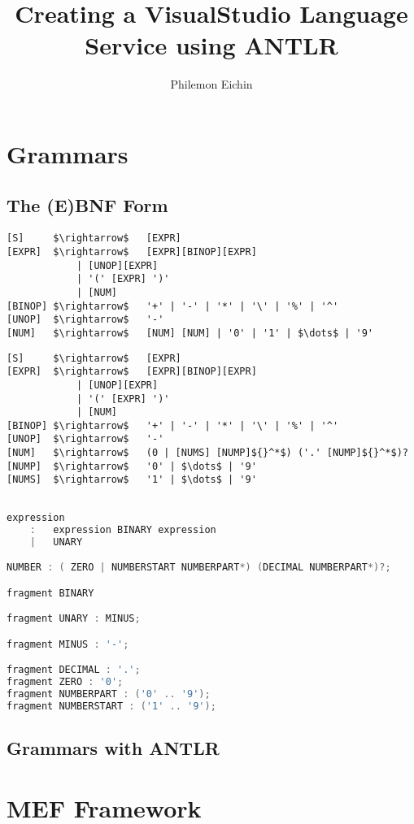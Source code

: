\documentclass{scrbook}
\author{Philemon Eichin}
\title{Creating a VisualStudio Language Service using ANTLR}
\begin{document}
\maketitle

\tableofcontents
\part{Grammars}
\chapter{The (E)BNF Form}
\lstset{language=BNF,tabsize=4, numbers=left, stepnumber=5, frame=single}
\begin{lstlisting}[caption={Basic mathematical grammar (BNF)}]
[S]		$\rightarrow$	[EXPR]
[EXPR]	$\rightarrow$	[EXPR][BINOP][EXPR]
			| [UNOP][EXPR] 
			| '(' [EXPR] ')' 
			| [NUM]
[BINOP]	$\rightarrow$	'+' | '-' | '*' | '\' | '%' | '^'
[UNOP]	$\rightarrow$ 	'-'
[NUM] 	$\rightarrow$ 	[NUM] [NUM] | '0' | '1' | $\dots$ | '9'
\end{lstlisting}

\begin{lstlisting}[caption={Better basic mathematical grammar (EBNF)}]
[S]		$\rightarrow$	[EXPR]
[EXPR]	$\rightarrow$	[EXPR][BINOP][EXPR]
			| [UNOP][EXPR] 
			| '(' [EXPR] ')' 
			| [NUM]
[BINOP]	$\rightarrow$	'+' | '-' | '*' | '\' | '%' | '^'
[UNOP]	$\rightarrow$ 	'-'
[NUM] 	$\rightarrow$ 	(0 | [NUMS] [NUMP]${}^*$) ('.' [NUMP]${}^*$)?
[NUMP]	$\rightarrow$ 	'0' | $\dots$ | '9'
[NUMS]	$\rightarrow$ 	'1' | $\dots$ | '9'
\end{lstlisting}

\begin{lstlisting}[caption={Basic mathematical grammar (ANTLR grammar)}, language=java]

expression
	:	expression BINARY expression
	|	UNARY

NUMBER : ( ZERO | NUMBERSTART NUMBERPART*) (DECIMAL NUMBERPART*)?;

fragment BINARY

fragment UNARY : MINUS;

fragment MINUS : '-';

fragment DECIMAL : '.';
fragment ZERO : '0';
fragment NUMBERPART : ('0' .. '9');
fragment NUMBERSTART : ('1' .. '9');
\end{lstlisting}
\chapter{Grammars with ANTLR}
\part{MEF Framework}

\lstlistoflistings
\end{document}
